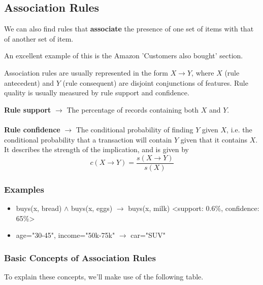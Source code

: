 \documentclass[english, 10pt]{article}
\begin{document}
\subsection{Association Rules}

We can also find rules that \textbf{associate} the presence of one set of items with that of another set of item.\\

\begin{myproof}
An excellent example of this is the Amazon 'Customers also bought' section.
\end{myproof}

Association rules are usually represented in the form $X \rightarrow Y$, where $X$ (rule antecedent) and $Y$ (rule consequent) are disjoint conjunctions of features. Rule quality is usually measured by rule support and confidence.\\

\begin{tcolorbox}[title=Definition:,colframe=red!75!black,colback=red!5!white,arc=0pt,fonttitle=\bfseries]
\textbf{Rule support} $\rightarrow$ The percentage of records containing both $X$ and $Y$.\\\\
\textbf{Rule confidence} $\rightarrow$ The conditional probability of finding $Y$ given $X$, i.e. the conditional probability that a transaction will contain $Y$ given that it contains $X$. It describes the strength of the implication, and is given by $$c(X \rightarrow Y) = \frac{s(X \rightarrow Y)}{s(X)}$$ 
\end{tcolorbox}

\subsubsection{Examples}
\begin{itemize}
	\item buys(x, bread) $\land$ buys(x, eggs) $\rightarrow$ buys(x, milk) <support: 0.6\%, confidence: 65\%>
	\item age="30-45", income="50k-75k" $\rightarrow$ car="SUV"
\end{itemize}

\subsubsection{Basic Concepts of Association Rules}

To explain these concepts, we'll make use of the following table.\\
\end{document}
